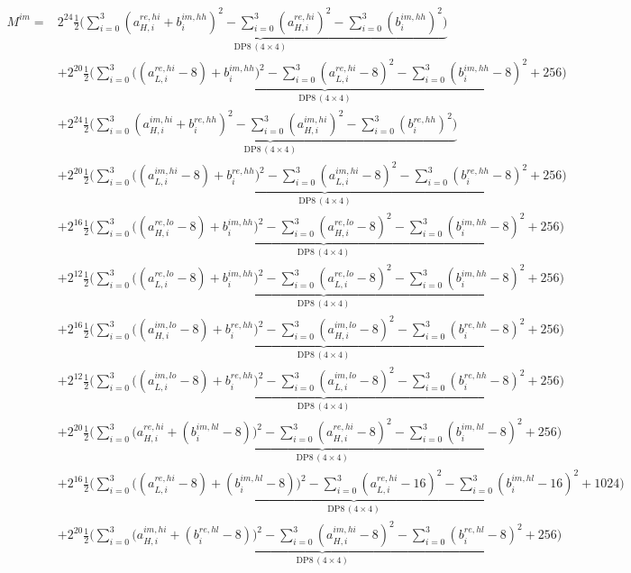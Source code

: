 \documentclass[fleqn]{article}
\newcommand{\DPop}[3]{\mathrm{DP#1}\,(#2\!\times\!#3)}
\begin{document}
\begin{align*}
M^{im} = {}
  & 2^{24}\underbrace{\tfrac12\Big(\sum_{i=0}^{3}(a_{H,i}^{re,hi}{+}b_i^{im,hh})^2 - \sum_{i=0}^{3}(a_{H,i}^{re,hi})^2 - \sum_{i=0}^{3}(b_i^{im,hh})^2\Big)}_{\DPop{8}{4}{4}} \\[0.35em]
  & + 2^{20}\underbrace{\tfrac12\Big(\sum_{i=0}^{3}\big((a_{L,i}^{re,hi}{-}8){+}b_i^{im,hh}\big)^2 - \sum_{i=0}^{3}(a_{L,i}^{re,hi}{-}8)^2 - \sum_{i=0}^{3}(b_i^{im,hh}{-}8)^2 + 256\Big)}_{\DPop{8}{4}{4}} \\[0.35em]
  & + 2^{24}\underbrace{\tfrac12\Big(\sum_{i=0}^{3}(a_{H,i}^{im,hi}{+}b_i^{re,hh})^2 - \sum_{i=0}^{3}(a_{H,i}^{im,hi})^2 - \sum_{i=0}^{3}(b_i^{re,hh})^2\Big)}_{\DPop{8}{4}{4}} \\[0.35em]
  & + 2^{20}\underbrace{\tfrac12\Big(\sum_{i=0}^{3}\big((a_{L,i}^{im,hi}{-}8){+}b_i^{re,hh}\big)^2 - \sum_{i=0}^{3}(a_{L,i}^{im,hi}{-}8)^2 - \sum_{i=0}^{3}(b_i^{re,hh}{-}8)^2 + 256\Big)}_{\DPop{8}{4}{4}} \\[0.35em]
  & + 2^{16}\underbrace{\tfrac12\Big(\sum_{i=0}^{3}\big((a_{H,i}^{re,lo}{-}8){+}b_i^{im,hh}\big)^2 - \sum_{i=0}^{3}(a_{H,i}^{re,lo}{-}8)^2 - \sum_{i=0}^{3}(b_i^{im,hh}{-}8)^2 + 256\Big)}_{\DPop{8}{4}{4}} \\[0.35em]
  & + 2^{12}\underbrace{\tfrac12\Big(\sum_{i=0}^{3}\big((a_{L,i}^{re,lo}{-}8){+}b_i^{im,hh}\big)^2 - \sum_{i=0}^{3}(a_{L,i}^{re,lo}{-}8)^2 - \sum_{i=0}^{3}(b_i^{im,hh}{-}8)^2 + 256\Big)}_{\DPop{8}{4}{4}} \\[0.35em]
  & + 2^{16}\underbrace{\tfrac12\Big(\sum_{i=0}^{3}\big((a_{H,i}^{im,lo}{-}8){+}b_i^{re,hh}\big)^2 - \sum_{i=0}^{3}(a_{H,i}^{im,lo}{-}8)^2 - \sum_{i=0}^{3}(b_i^{re,hh}{-}8)^2 + 256\Big)}_{\DPop{8}{4}{4}} \\[0.35em]
  & + 2^{12}\underbrace{\tfrac12\Big(\sum_{i=0}^{3}\big((a_{L,i}^{im,lo}{-}8){+}b_i^{re,hh}\big)^2 - \sum_{i=0}^{3}(a_{L,i}^{im,lo}{-}8)^2 - \sum_{i=0}^{3}(b_i^{re,hh}{-}8)^2 + 256\Big)}_{\DPop{8}{4}{4}} \\[0.35em]
  & + 2^{20}\underbrace{\tfrac12\Big(\sum_{i=0}^{3}\big(a_{H,i}^{re,hi}{+}(b_i^{im,hl}{-}8)\big)^2 - \sum_{i=0}^{3}(a_{H,i}^{re,hi}{-}8)^2 - \sum_{i=0}^{3}(b_i^{im,hl}{-}8)^2 + 256\Big)}_{\DPop{8}{4}{4}} \\[0.35em]
  & + 2^{16}\underbrace{\tfrac12\Big(\sum_{i=0}^{3}\big((a_{L,i}^{re,hi}{-}8){+}(b_i^{im,hl}{-}8)\big)^2 - \sum_{i=0}^{3}(a_{L,i}^{re,hi}{-}16)^2 - \sum_{i=0}^{3}(b_i^{im,hl}{-}16)^2 + 1024\Big)}_{\DPop{8}{4}{4}} \\[0.35em]
  & + 2^{20}\underbrace{\tfrac12\Big(\sum_{i=0}^{3}\big(a_{H,i}^{im,hi}{+}(b_i^{re,hl}{-}8)\big)^2 - \sum_{i=0}^{3}(a_{H,i}^{im,hi}{-}8)^2 - \sum_{i=0}^{3}(b_i^{re,hl}{-}8)^2 + 256\Big)}_{\DPop{8}{4}{4}} \\[0.35em]

\end{align*}
\end{document}
